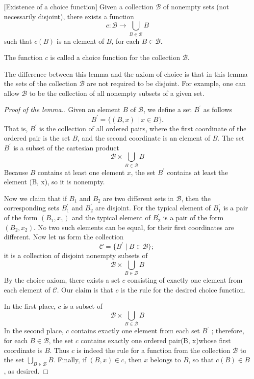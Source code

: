 \begin{lemma}
\label{lem:\thetheorem}[Existence of a choice function]
 Given a collection \(\mathcal{B}\) of nonempty sets (not necessarily disjoint), there exists a function
 \[
 c : \mathcal{B} \rightarrow \mathop{\bigcup }\limits_{{B \in \mathcal{B}}}B
 \]
 such that \(c(B)\) is an element of \(B\), for each \(B \in \mathcal{B}\).
\end{lemma}

The function \(c\) is called a choice function for the collection \(\mathcal{B}\).

The difference between this lemma and the axiom of choice is that in this lemma 
the sets of the collection \(\mathcal{B}\) are not required to be disjoint. 
For example, one can allow \(\mathcal{B}\) to be the collection of all nonempty 
subsets of a given set.

\begin{proof}[Proof of the lemma.]
 Given an element \(B\) of \(\mathcal{B}\), we define a set \(B^{\prime }\) as follows
 \[
 B^{\prime } = \{ ({B,x}) \mid x \in B\}.
 \]
 That is, \(B^{\prime }\) is the collection of all ordered pairs, where the first coordinate of the ordered pair is the set \(B\), and the second coordinate is an element of \(B\). The set \(B^{\prime }\) is a subset of the cartesian product
 \[
 \mathcal{B} \times \mathop{\bigcup }\limits_{{B \in \mathcal{B}}}B
 \]
 Because \(B\) contains at least one element \(x\), the set \(B^{\prime }\) contains at least the element (B, x), so it is nonempty.

 Now we claim that if \(B_{1}\) and \(B_{2}\) are two different sets in \(\mathcal{B}\), then the corresponding sets \(B_1^{\prime }\) and \(B_2^{\prime }\) are disjoint. For the typical element of \(B_1^{\prime }\) is a pair of the form \(({B_{1},x_{1}})\) and the typical element of \(B_2^{\prime }\) is a pair of the form \(({B_{2},x_{2}})\). No two such elements can be equal, for their first coordinates are different. Now let us form the collection
 \[
 \mathcal{C} = \{ {B^{\prime } \mid B \in \mathcal{B}}\} \text{; }
 \]
 it is a collection of disjoint nonempty subsets of
 \[
 \mathcal{B} \times \mathop{\bigcup }\limits_{{B \in \mathcal{B}}}B
 \]
 By the choice axiom, there exists a set \(c\) consisting of exactly one element from each element of \(\mathcal{C}\). Our claim is that \(c\) is the rule for the desired choice function.

 In the first place, \(c\) is a subset of
 \[
 \mathcal{B} \times \mathop{\bigcup }\limits_{{B \in \mathcal{B}}}B
 \]
 In the second place, \(c\) contains exactly one element from each set \(B^{\prime }\) ; therefore, for each \(B \in \mathcal{B}\), the set \(c\) contains exactly one ordered pair(B, x)whose first coordinate is \(B\). Thus \(c\) is indeed the rule for a function from the collection \(\mathcal{B}\) to the set \(\mathop{\bigcup }\limits_{{B \in \mathcal{B}}}B\). Finally, if \(({B,x}) \in c\), then \(x\) belongs to \(B\), so that \(c(B) \in B\), as desired.
\end{proof}

